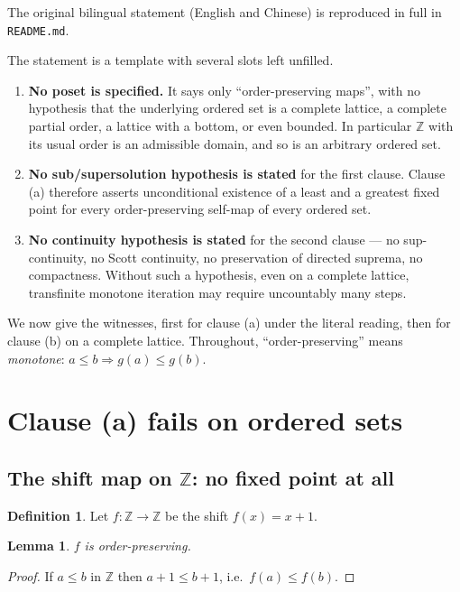 \documentclass[11pt]{article}
\newtheorem{lemma}[theorem]{Lemma}
\theoremstyle{definition}
\newtheorem{definition}[theorem]{Definition}
\theoremstyle{remark}
\newcommand{\Z}{\mathbb{Z}}
\begin{document}
\noindent The original bilingual statement (English and Chinese) is reproduced
in full in \texttt{README.md}.

The statement is a template with several slots left unfilled.

\begin{enumerate}
  \item \textbf{No poset is specified.} It says only ``order-preserving maps'',
    with no hypothesis that the underlying ordered set is a complete lattice, a
    complete partial order, a lattice with a bottom, or even bounded. In
    particular $\Z$ with its usual order is an admissible domain, and so is an
    arbitrary ordered set.
  \item \textbf{No sub/supersolution hypothesis is stated} for the first
    clause. Clause (a) therefore asserts unconditional existence of a least and
    a greatest fixed point for every order-preserving self-map of every ordered
    set.
  \item \textbf{No continuity hypothesis is stated} for the second clause ---
    no sup-continuity, no Scott continuity, no preservation of directed
    suprema, no compactness. Without such a hypothesis, even on a complete
    lattice, transfinite monotone iteration may require uncountably many steps.
\end{enumerate}

We now give the witnesses, first for clause (a) under the literal reading, then
for clause (b) on a complete lattice. Throughout, ``order-preserving'' means
\emph{monotone}: $a\le b \Rightarrow g(a)\le g(b)$.

\section{Clause (a) fails on ordered sets}

\subsection{The shift map on $\Z$: no fixed point at all}

\begin{definition}
Let $f:\Z\to\Z$ be the shift $f(x)=x+1$.
\end{definition}

\begin{lemma}\label{lem:fmono}
$f$ is order-preserving.
\end{lemma}

\begin{proof}
If $a\le b$ in $\Z$ then $a+1\le b+1$, i.e.\ $f(a)\le f(b)$.
\end{proof}
\end{document}
